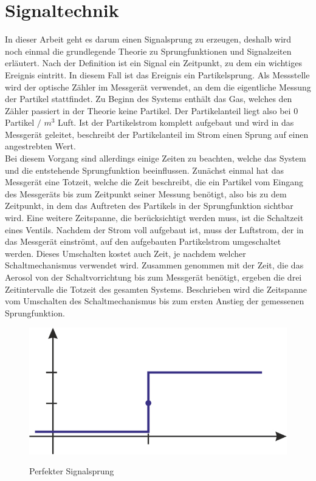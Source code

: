 \section{Signaltechnik}
In dieser Arbeit geht es darum einen Signalsprung zu erzeugen, deshalb wird noch einmal die grundlegende Theorie zu Sprungfunktionen und Signalzeiten erl\"{a}utert. Nach der Definition ist ein Signal ein Zeitpunkt, zu dem ein wichtiges Ereignis eintritt. In diesem Fall ist das Ereignis ein Partikelsprung. Als Messstelle wird der optische Z\"{a}hler im Messger\"{a}t verwendet, an dem die eigentliche Messung der Partikel stattfindet. Zu Beginn des Systems enth\"{a}lt das Gas, welches den Z\"{a}hler passiert in der Theorie keine Partikel. Der Partikelanteil liegt also bei \(0\) Partikel \(/\) \(m^3\) Luft. Ist der Partikelstrom komplett aufgebaut und wird in das Messger\"{a}t geleitet, beschreibt der Partikelanteil im Strom einen Sprung auf einen angestrebten Wert.
\\
Bei diesem Vorgang sind allerdings einige Zeiten zu beachten, welche das System und die entstehende Sprungfunktion beeinflussen. Zun\"{a}chst einmal hat das Messger\"{a}t eine Totzeit, welche die Zeit beschreibt, die ein Partikel vom Eingang des Messger\"{a}ts bis zum Zeitpunkt seiner Messung ben\"{o}tigt, also bis zu dem Zeitpunkt, in dem das Auftreten des Partikels in der Sprungfunktion sichtbar wird. Eine weitere Zeitspanne, die ber\"{u}cksichtigt werden muss, ist die Schaltzeit eines Ventils. Nachdem der Strom voll aufgebaut ist, muss der Luftstrom, der in das Messger\"{a}t einstr\"{o}mt, auf den aufgebauten Partikelstrom umgeschaltet werden. Dieses Umschalten kostet auch Zeit, je nachdem welcher Schaltmechanismus verwendet wird. Zusammen genommen mit der Zeit, die das Aerosol von der Schaltvorrichtung bis zum Messger\"{a}t ben\"{o}tigt, ergeben die drei Zeitintervalle die Totzeit des gesamten Systems. Beschrieben wird die Zeitspanne vom Umschalten des Schaltmechanismus bis zum ersten Anstieg der gemessenen Sprungfunktion.
\begin{figure}[H]
        \myfloatalign
        {\includegraphics[width=.6\linewidth]{gfx/fundamentals/jump.jpg}} \quad
        \caption[Perfekter Signalsprung]
        {Perfekter Signalsprung}
        \label{fig:sprung}
\end{figure}